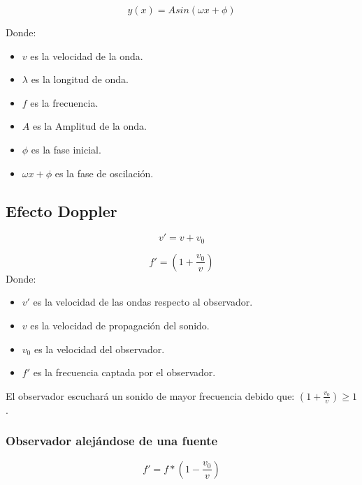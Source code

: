 \documentclass[]{article}
\begin{document}
\begin{equation}
y(x)=Asin(\omega x+ \phi)
\end{equation}

Donde:\\

\begin{itemize}
	\item $v$ es la velocidad de la onda.
	\item $\lambda$ es la longitud de onda.
	\item $f$ es la frecuencia.
	\item $A$ es la Amplitud de la onda.
	\item $\phi$ es la fase inicial.
	\item $\omega x+ \phi$ es la fase de oscilación.
\end{itemize}

\subsection{Efecto Doppler}


\begin{equation}
v'=v+v_0	
\end{equation}

\begin{equation}
f'=(1+\frac{v_0}{v})
\end{equation}
Donde:\\


\begin{itemize}
	\item $v'$ es la velocidad de las ondas respecto al observador.
	\item $v$ es la velocidad de propagación del sonido.
	\item $v_0$ es la velocidad del observador.
	\item $f'$ es la frecuencia captada por el observador.
\end{itemize}

El observador escuchará un sonido de mayor frecuencia debido que: $(1+\frac{v_0}{v}) \geq 1$.\\

\subsubsection{Observador alejándose de una fuente}

\begin{equation}
f'=f*(1-\frac{v_0}{v})
\end{equation}
\end{document}
